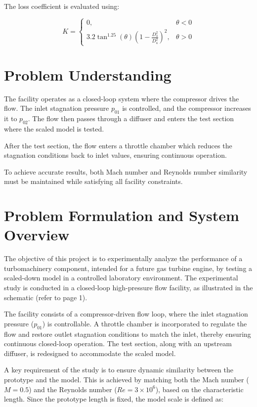 \documentclass[12pt]{article}
\begin{document}
The loss coefficient is evaluated using:

\[
K =
\begin{cases}
0, & \theta < 0 \\
3.2 \tan^{1.25}(\theta)\left(1 - \frac{D_3^2}{D_4^2}\right)^2, & \theta > 0
\end{cases}
\]


\section*{Problem Understanding}

\justifying
The facility operates as a closed-loop system where the compressor drives the flow. The inlet stagnation pressure \( p_{01} \) is controlled, and the compressor increases it to \( p_{02} \). The flow then passes through a diffuser and enters the test section where the scaled model is tested.

After the test section, the flow enters a throttle chamber which reduces the stagnation conditions back to inlet values, ensuring continuous operation.

To achieve accurate results, both Mach number and Reynolds number similarity must be maintained while satisfying all facility constraints.


\newpage
\section{Problem Formulation and System Overview}

The objective of this project is to experimentally analyze the performance of a turbomachinery component, intended for a future gas turbine engine, by testing a scaled-down model in a controlled laboratory environment. The experimental study is conducted in a closed-loop high-pressure flow facility, as illustrated in the schematic (refer to page 1).

The facility consists of a compressor-driven flow loop, where the inlet stagnation pressure ($p_{01}$) is controllable. A throttle chamber is incorporated to regulate the flow and restore outlet stagnation conditions to match the inlet, thereby ensuring continuous closed-loop operation. The test section, along with an upstream diffuser, is redesigned to accommodate the scaled model.

A key requirement of the study is to ensure dynamic similarity between the prototype and the model. This is achieved by matching both the Mach number ($M = 0.5$) and the Reynolds number ($Re = 3 \times 10^6$), based on the characteristic length. Since the prototype length is fixed, the model scale is defined as:
\end{document}
